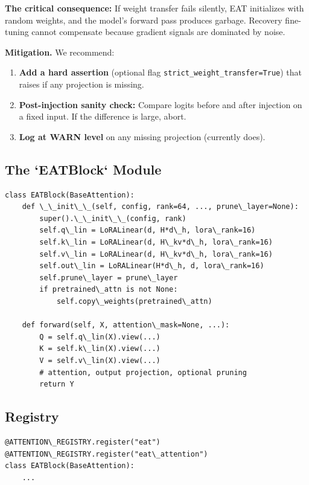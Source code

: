 \textbf{The critical consequence:} If weight transfer fails silently, EAT 
initializes with random weights, and the model's forward pass produces 
garbage. Recovery fine-tuning cannot compensate because gradient signals 
are dominated by noise.

\textbf{Mitigation.} We recommend:

\begin{enumerate}
\item \textbf{Add a hard assertion} (optional flag \texttt{strict\_weight\_transfer=True})
  that raises if any projection is missing.
\item \textbf{Post-injection sanity check:} Compare logits before and after
  injection on a fixed input. If the difference is large, abort.
\item \textbf{Log at WARN level} on any missing projection (currently does).

\end{enumerate}
\subsection{The `EATBlock` Module}

\begin{lstlisting}
class EATBlock(BaseAttention):
    def \_\_init\_\_(self, config, rank=64, ..., prune\_layer=None):
        super().\_\_init\_\_(config, rank)
        self.q\_lin = LoRALinear(d, H*d\_h, lora\_rank=16)
        self.k\_lin = LoRALinear(d, H\_kv*d\_h, lora\_rank=16)
        self.v\_lin = LoRALinear(d, H\_kv*d\_h, lora\_rank=16)
        self.out\_lin = LoRALinear(H*d\_h, d, lora\_rank=16)
        self.prune\_layer = prune\_layer
        if pretrained\_attn is not None:
            self.copy\_weights(pretrained\_attn)
    
    def forward(self, X, attention\_mask=None, ...):
        Q = self.q\_lin(X).view(...)
        K = self.k\_lin(X).view(...)
        V = self.v\_lin(X).view(...)
        # attention, output projection, optional pruning
        return Y
\end{lstlisting}

\subsection{Registry}

\begin{lstlisting}
@ATTENTION\_REGISTRY.register("eat")
@ATTENTION\_REGISTRY.register("eat\_attention")
class EATBlock(BaseAttention):
    ...
\end{lstlisting}

